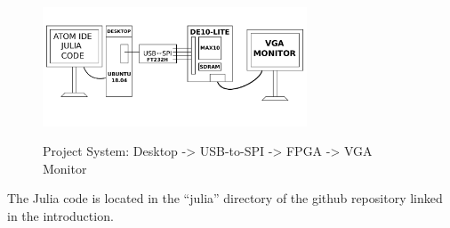 \begin{figure}[ht]
	\centering
	\includegraphics[width=0.7\textwidth]{images/project_system}
	\centering\bfseries
	\caption{Project System:  Desktop -> USB-to-SPI -> FPGA -> VGA Monitor}
\end{figure}

The Julia code is located in the ``julia'' directory of the github repository linked in the introduction.
